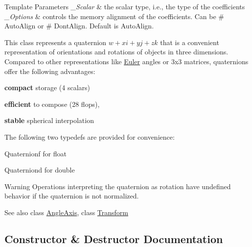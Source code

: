 \begin{DoxyTemplParams}{Template Parameters}
{\em \+\_\+\+Scalar} & the scalar type, i.\+e., the type of the coefficients \\
\hline
{\em \+\_\+\+Options} & controls the memory alignment of the coefficients. Can be \# Auto\+Align or \# Dont\+Align. Default is Auto\+Align.\\
\hline
\end{DoxyTemplParams}
This class represents a quaternion $ w+xi+yj+zk $ that is a convenient representation of orientations and rotations of objects in three dimensions. Compared to other representations like \mbox{\hyperlink{class_euler}{Euler}} angles or 3x3 matrices, quaternions offer the following advantages\+: \begin{DoxyItemize}
\item {\bfseries{compact}} storage (4 scalars) \item {\bfseries{efficient}} to compose (28 flops), \item {\bfseries{stable}} spherical interpolation\end{DoxyItemize}
The following two typedefs are provided for convenience\+: \begin{DoxyItemize}
\item {\ttfamily Quaternionf} for {\ttfamily float} \item {\ttfamily Quaterniond} for {\ttfamily double} \end{DoxyItemize}
\begin{DoxyWarning}{Warning}
Operations interpreting the quaternion as rotation have undefined behavior if the quaternion is not normalized.
\end{DoxyWarning}
\begin{DoxySeeAlso}{See also}
class \mbox{\hyperlink{class_eigen_1_1_angle_axis}{Angle\+Axis}}, class \mbox{\hyperlink{class_eigen_1_1_transform}{Transform}} 
\end{DoxySeeAlso}


\subsection{Constructor \& Destructor Documentation}
\mbox{\label{class_eigen_1_1_quaternion_a7f8e93e2615e56344fd0d89c2916f9be}} 
